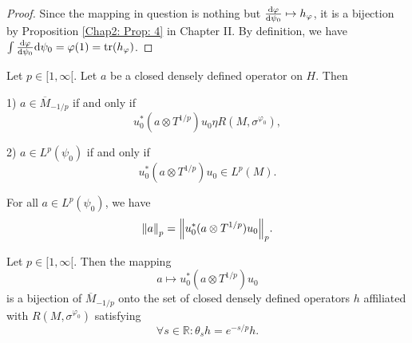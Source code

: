 \begin{proof}
    Since the mapping in question is nothing but $\dv{\varphi}{\psi_0}\mapsto h_\varphi$, it is a bijection by Proposition \ref{Chap2: Prop: 4} in Chapter II. By definition, we have $\int \dv{\varphi}{\psi_0}\dd \psi_0=\varphi(1)=\tr(h_\varphi)$.
\end{proof}
\begin{corollary}
    Let $p\in [1,\infty[$. Let $a$ be a closed densely defined operator on $H$. Then\par
    1) $a\in \overline{M}_{-1/p}$ if and only if
    \[
        u_0^*(a\otimes T^{1/p})u_0\eta R(M,\sigma^{\varphi_0}),
    \]\par
    2) $a\in L^p(\psi_0)$ if and only if
    \[
        u_0^*(a\otimes T^{1/p})u_0\in L^p(M).
    \]\par
    For all $a\in L^p(\psi_0)$, we have
    \[
        \norm{a}_p=\norm{u_0^*(a\otimes T^{1/p})u_0}_p.
    \]
\end{corollary}
\begin{corollary}
    Let $p\in [1,\infty[$. Then the mapping
    \begin{equation}
        a\mapsto u_0^*(a\otimes T^{1/p})u_0
    \end{equation}
    is a bijection of $\overline{M}_{-1/p}$ onto the set of closed densely defined operators $h$ affiliated with $R(M,\sigma^{\varphi_0})$ satisfying
    \begin{equation}
        \forall s\in \mathbb{R}:\theta_s h=e^{-s/p}h.
    \end{equation}
\end{corollary}
% 